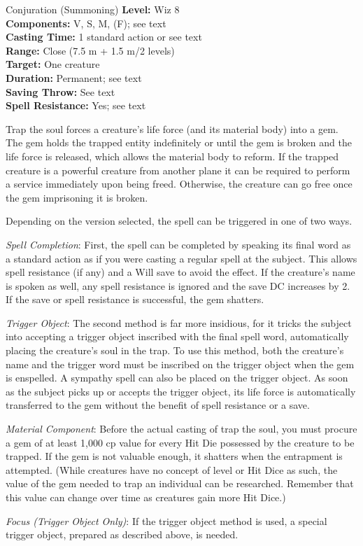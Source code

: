 {Conjuration (Summoning)}
{
	\textbf{Level:}
	Wiz 8\\
	\textbf{Components:}
	V, S, M, (F); see text\\
	\textbf{Casting Time:}
	1 standard action or see text\\
	\textbf{Range:}
	Close (7.5 m + 1.5 m/2 levels)\\
	\textbf{Target:}
	One creature\\
	\textbf{Duration:}
	Permanent; see text\\
	\textbf{Saving Throw:}
	See text\\
	\textbf{Spell Resistance:}
	Yes; see text\\
}
{
	Trap the soul forces a creature's life force (and its material body) into a gem. The gem holds the trapped entity indefinitely or until the gem is broken and the life force is released, which allows the material body to reform. If the trapped creature is a powerful creature from another plane it can be required to perform a service immediately upon being freed. Otherwise, the creature can go free once the gem imprisoning it is broken.

	Depending on the version selected, the spell can be triggered in one of two ways.

	\textit{Spell Completion}:
	First, the spell can be completed by speaking its final word as a standard action as if you were casting a regular spell at the subject. This allows spell resistance (if any) and a Will save to avoid the effect. If the creature's name is spoken as well, any spell resistance is ignored and the save DC increases by 2. If the save or spell resistance is successful, the gem shatters.

	\textit{Trigger Object}:
	The second method is far more insidious, for it tricks the subject into accepting a trigger object inscribed with the final spell word, automatically placing the creature's soul in the trap. To use this method, both the creature's name and the trigger word must be inscribed on the trigger object when the gem is enspelled. A sympathy spell can also be placed on the trigger object. As soon as the subject picks up or accepts the trigger object, its life force is automatically transferred to the gem without the benefit of spell resistance or a save.

	\textit{Material Component}:
	Before the actual casting of trap the soul, you must procure a gem of at least 1,000 cp value for every Hit Die possessed by the creature to be trapped. If the gem is not valuable enough, it shatters when the entrapment is attempted. (While creatures have no concept of level or Hit Dice as such, the value of the gem needed to trap an individual can be researched. Remember that this value can change over time as creatures gain more Hit Dice.)

	\textit{Focus (Trigger Object Only)}:
	If the trigger object method is used, a special trigger object, prepared as described above, is needed.

}
